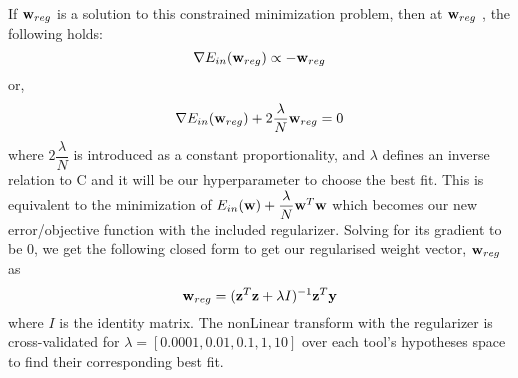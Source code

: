 If ${\bf w}_{reg}$ is a solution to this constrained minimization problem, then at ${\bf w}_{reg}$ , the following holds:
\[\nabla E_{in}({\bf w}_{reg}) \propto - {\bf w}_{reg}\]
or,
\[\nabla E_{in}({\bf w}_{reg}) + 2\dfrac{\lambda}{N}{\bf w}_{reg} = 0\]
where $2\dfrac{\lambda}{N}$ is introduced as a constant proportionality, and $\lambda$ defines an inverse relation to C and it will be our hyperparameter to choose the best fit. \newline
This is equivalent to the minimization of $E_{in}({\bf w}) + \dfrac{\lambda}{N}{\bf w}^T {\bf w}$ which becomes our new error/objective function with the included regularizer. Solving for its gradient to be 0, we get the following closed form to get our regularised weight vector, ${\bf w}_{reg}$ as
\[ {\bf w}_{reg} = ({\bf z}^T {\bf z} + \lambda I)^{-1} {\bf z}^T {\bf y} \]
where $I$ is the identity matrix.
\newline
The nonLinear transform with the regularizer is cross-validated for $\lambda = [0.0001,0.01,0.1,1,10]$ over each tool's hypotheses space to find their corresponding best fit. \newline